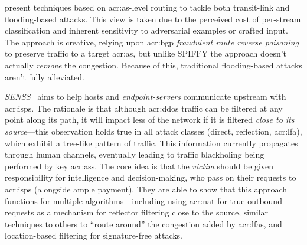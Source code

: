 \Textcite{DBLP:conf/sp/SmithS18} present techniques based on \gls{acr:as}-level routing to tackle both transit-link and flooding-based attacks.
This view is taken due to the perceived cost of per-stream classification and inherent sensitivity to adversarial examples or crafted input.
The approach is creative, relying upon \gls{acr:bgp} \emph{fraudulent route reverse poisoning} to preserve traffic to a target \gls{acr:as}, but unlike SPIFFY the approach doesn't actually \emph{remove} the congestion.
Because of this, traditional flooding-based attacks aren't fully alleviated.

\emph{SENSS}~\parencite{DBLP:conf/acsac/RamanathanMYZ18} aims to help hosts and \emph{endpoint-servers} communicate upstream with \glspl{acr:isp}.
The rationale is that although \gls{acr:ddos} traffic can be filtered at any point along its path, it will impact less of the network if it is filtered \emph{close to its source}---this observation holds true in all attack classes (direct, reflection, \gls{acr:lfa}), which exhibit a tree-like pattern of traffic.
This information currently propagates through human channels, eventually leading to traffic blackholing being performed by key \glspl{acr:as}.
The core idea is that the \emph{victim} should be given responsibility for intelligence and decision-making, who pass on their requests to \glspl{acr:isp} (alongside ample payment).
They are able to show that this approach functions for multiple algorithms---including using \gls{acr:nat} for true outbound requests as a mechanism for reflector filtering close to the source, similar techniques to others to ``route around'' the congestion added by \glspl{acr:lfa}, and location-based filtering for signature-free attacks.

